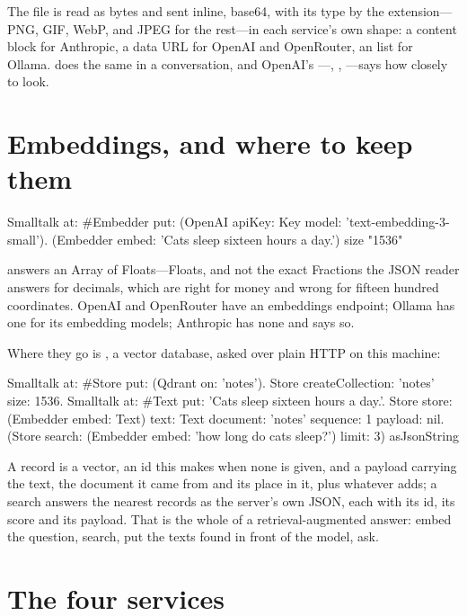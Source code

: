 The file is read as bytes and sent inline, base64, with its type by the
extension---PNG, GIF, WebP, and JPEG for the rest---in each service's own
shape: a content block for Anthropic, a data URL for OpenAI and OpenRouter,
an  list for Ollama.  does the same in a
conversation, and OpenAI's ---, ,
---says how closely to look.

\section{Embeddings, and where to keep them}

\begin{st}
Smalltalk at: #Embedder put: (OpenAI apiKey: Key model: 'text-embedding-3-small').
(Embedder embed: 'Cats sleep sixteen hours a day.') size          "1536"
\end{st}

 answers an Array of Floats---Floats, and not the exact
Fractions the JSON reader answers for decimals, which are right for money
and wrong for fifteen hundred coordinates. OpenAI and OpenRouter have an
embeddings endpoint; Ollama has one for its embedding models; Anthropic has
none and says so.

Where they go is , a vector database, asked over plain HTTP on
this machine:

\begin{st}
Smalltalk at: #Store put: (Qdrant on: 'notes').
Store createCollection: 'notes' size: 1536.
Smalltalk at: #Text put: 'Cats sleep sixteen hours a day.'.
Store store: (Embedder embed: Text) text: Text document: 'notes' sequence: 1 payload: nil.
(Store search: (Embedder embed: 'how long do cats sleep?') limit: 3) asJsonString
\end{st}

A record is a vector, an id this makes when none is given, and a payload
carrying the text, the document it came from and its place in it, plus
whatever  adds; a search answers the nearest records as the
server's own JSON, each with its id, its score and its payload. That is
the whole of a retrieval-augmented answer: embed the question, search, put
the texts found in front of the model, ask.

\section{The four services}

